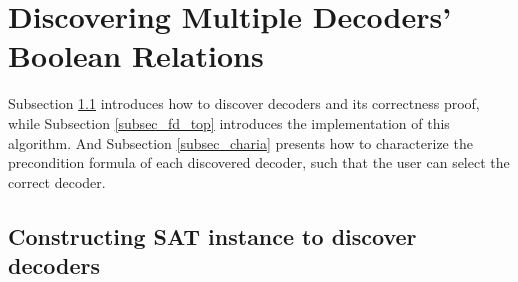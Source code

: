 \documentclass[journal]{IEEEtran}
\begin{document}
%
%
%
%
%


\section{Discovering Multiple Decoders' Boolean Relations}\label{sec_fdtest}
Subsection \ref{subsec_fd_detail} introduces how to discover decoders and its correctness proof,
while Subsection \ref{subsec_fd_top} introduces the implementation of this algorithm.
And Subsection \ref{subsec_charia} presents how to characterize the precondition formula of each discovered decoder,
such that the user can select the correct decoder.

\subsection{Constructing SAT instance to discover decoders}\label{subsec_fd_detail}
%
\end{document}
